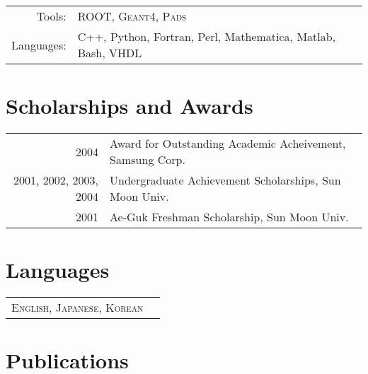 \documentclass[a4paper,10pt]{article} %
\begin{document}
\begin{tabular}{rl}
	Tools: & \textsc{ROOT}, \textsc{Geant4}, \textsc{Pads}\\
	Languages: & C++, Python, Fortran, Perl, Mathematica, Matlab, Bash, VHDL\\
\end{tabular}


\section{Scholarships and Awards}

\begin{tabular}{rl}
	2004 & Award for Outstanding Academic Acheivement, Samsung Corp.\\
	2001, 2002, 2003, 2004 & Undergraduate Achievement Scholarships, Sun Moon
	Univ.\\
	2001 & Ae-Guk Freshman Scholarship, Sun Moon Univ.\\
\end{tabular}


\section{Languages}

\begin{tabular}{rl}
	\textsc{English}, \textsc{Japanese}, \textsc{Korean}\\
\end{tabular}

\newpage


\section{Publications}
\end{document}
